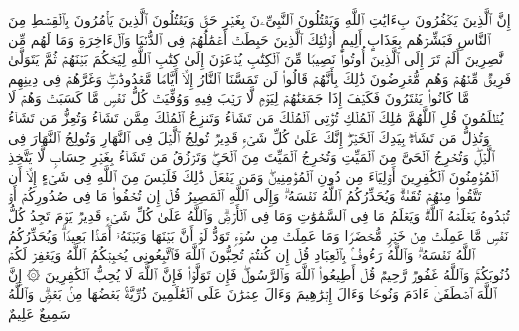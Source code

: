 \stopbuffer%
\startbuffer[\q:3:21]
إِنَّ ٱلَّذِینَ یَكۡفُرُونَ بِءَایَٰتِ ٱللَّهِ وَیَقۡتُلُونَ ٱلنَّبِیِّۦنَ بِغَیۡرِ حَقࣲّ وَیَقۡتُلُونَ ٱلَّذِینَ یَأۡمُرُونَ بِٱلۡقِسۡطِ مِنَ ٱلنَّاسِ فَبَشِّرۡهُم بِعَذَابٍ أَلِیمٍ%
\stopbuffer%
\startbuffer[\q:3:22]
أُو۟لَٰۤئِكَ ٱلَّذِینَ حَبِطَتۡ أَعۡمَٰلُهُمۡ فِی ٱلدُّنۡیَا وَٱلۡءَاخِرَةِ وَمَا لَهُم مِّن نَّٰصِرِینَ%
\stopbuffer%
\startbuffer[\q:3:23]
أَلَمۡ تَرَ إِلَى ٱلَّذِینَ أُوتُوا۟ نَصِیبࣰا مِّنَ ٱلۡكِتَٰبِ یُدۡعَوۡنَ إِلَىٰ كِتَٰبِ ٱللَّهِ لِیَحۡكُمَ بَیۡنَهُمۡ ثُمَّ یَتَوَلَّىٰ فَرِیقࣱ مِّنۡهُمۡ وَهُم مُّعۡرِضُونَ%
\stopbuffer%
\startbuffer[\q:3:24]
ذَٰلِكَ بِأَنَّهُمۡ قَالُوا۟ لَن تَمَسَّنَا ٱلنَّارُ إِلَّاۤ أَیَّامࣰا مَّعۡدُودَٰتࣲۖ وَغَرَّهُمۡ فِی دِینِهِم مَّا كَانُوا۟ یَفۡتَرُونَ%
\stopbuffer%
\startbuffer[\q:3:25]
فَكَیۡفَ إِذَا جَمَعۡنَٰهُمۡ لِیَوۡمࣲ لَّا رَیۡبَ فِیهِ وَوُفِّیَتۡ كُلُّ نَفۡسࣲ مَّا كَسَبَتۡ وَهُمۡ لَا یُظۡلَمُونَ%
\stopbuffer%
\startbuffer[\q:3:26]
قُلِ ٱللَّهُمَّ مَٰلِكَ ٱلۡمُلۡكِ تُؤۡتِی ٱلۡمُلۡكَ مَن تَشَاۤءُ وَتَنزِعُ ٱلۡمُلۡكَ مِمَّن تَشَاۤءُ وَتُعِزُّ مَن تَشَاۤءُ وَتُذِلُّ مَن تَشَاۤءُۖ بِیَدِكَ ٱلۡخَیۡرُۖ إِنَّكَ عَلَىٰ كُلِّ شَیۡءࣲ قَدِیرࣱ%
\stopbuffer%
\startbuffer[\q:3:27]
تُولِجُ ٱلَّیۡلَ فِی ٱلنَّهَارِ وَتُولِجُ ٱلنَّهَارَ فِی ٱلَّیۡلِۖ وَتُخۡرِجُ ٱلۡحَیَّ مِنَ ٱلۡمَیِّتِ وَتُخۡرِجُ ٱلۡمَیِّتَ مِنَ ٱلۡحَیِّۖ وَتَرۡزُقُ مَن تَشَاۤءُ بِغَیۡرِ حِسَابࣲ%
\stopbuffer%
\startbuffer[\q:3:28]
لَّا یَتَّخِذِ ٱلۡمُؤۡمِنُونَ ٱلۡكَٰفِرِینَ أَوۡلِیَاۤءَ مِن دُونِ ٱلۡمُؤۡمِنِینَۖ وَمَن یَفۡعَلۡ ذَٰلِكَ فَلَیۡسَ مِنَ ٱللَّهِ فِی شَیۡءٍ إِلَّاۤ أَن تَتَّقُوا۟ مِنۡهُمۡ تُقَىٰةࣰۗ وَیُحَذِّرُكُمُ ٱللَّهُ نَفۡسَهُۥۗ وَإِلَى ٱللَّهِ ٱلۡمَصِیرُ%
\stopbuffer%
\startbuffer[\q:3:29]
قُلۡ إِن تُخۡفُوا۟ مَا فِی صُدُورِكُمۡ أَوۡ تُبۡدُوهُ یَعۡلَمۡهُ ٱللَّهُۗ وَیَعۡلَمُ مَا فِی ٱلسَّمَٰوَٰتِ وَمَا فِی ٱلۡأَرۡضِۗ وَٱللَّهُ عَلَىٰ كُلِّ شَیۡءࣲ قَدِیرࣱ%
\stopbuffer%
\startbuffer[\q:3:30]
یَوۡمَ تَجِدُ كُلُّ نَفۡسࣲ مَّا عَمِلَتۡ مِنۡ خَیۡرࣲ مُّحۡضَرࣰا وَمَا عَمِلَتۡ مِن سُوۤءࣲ تَوَدُّ لَوۡ أَنَّ بَیۡنَهَا وَبَیۡنَهُۥۤ أَمَدَۢا بَعِیدࣰاۗ وَیُحَذِّرُكُمُ ٱللَّهُ نَفۡسَهُۥۗ وَٱللَّهُ رَءُوفُۢ بِٱلۡعِبَادِ%
\stopbuffer%
\startbuffer[\q:3:31]
قُلۡ إِن كُنتُمۡ تُحِبُّونَ ٱللَّهَ فَٱتَّبِعُونِی یُحۡبِبۡكُمُ ٱللَّهُ وَیَغۡفِرۡ لَكُمۡ ذُنُوبَكُمۡۚ وَٱللَّهُ غَفُورࣱ رَّحِیمࣱ%
\stopbuffer%
\startbuffer[\q:3:32]
قُلۡ أَطِیعُوا۟ ٱللَّهَ وَٱلرَّسُولَۖ فَإِن تَوَلَّوۡا۟ فَإِنَّ ٱللَّهَ لَا یُحِبُّ ٱلۡكَٰفِرِینَ%
\stopbuffer%
\startbuffer[\q:3:33]
۞ إِنَّ ٱللَّهَ ٱصۡطَفَىٰۤ ءَادَمَ وَنُوحࣰا وَءَالَ إِبۡرَٰهِیمَ وَءَالَ عِمۡرَٰنَ عَلَى ٱلۡعَٰلَمِینَ%
\stopbuffer%
\startbuffer[\q:3:34]
ذُرِّیَّةَۢ بَعۡضُهَا مِنۢ بَعۡضࣲۗ وَٱللَّهُ سَمِیعٌ عَلِیمٌ%
